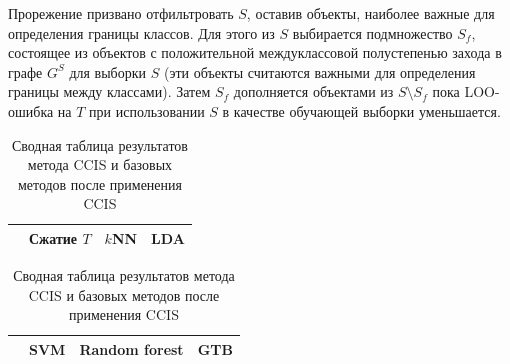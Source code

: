 Прорежение призвано отфильтровать \(S\), оставив объекты, наиболее важные для определения границы классов. Для этого из \(S\) выбирается подмножество \(S_f\), состоящее из объектов с положительной междуклассовой полустепенью захода в графе \(G^S\) для выборки \(S\) (эти объекты считаются важными для определения границы между классами). Затем \(S_f\) дополняется объектами из \(S\setminus S_f\) пока LOO-ошибка на \(T\) при использовании \(S\) в качестве обучающей выборки уменьшается.

\begin{table}[h!]
    \centering
    \begin{tabular}{|c||c||c|c|}
    \cline{2-4}
    \multicolumn{1}{c||}{} & Сжатие \(T\) & \(k\)NN & LDA \\
    \hline \hline
	
\end{tabular}
\newline \vspace*{0.5cm} \newline
\begin{tabular}{|c||c|c|c|}
    \cline{2-4}
    \multicolumn{1}{c||}{} & SVM & Random forest & GTB \\
    \hline \hline
	
    \end{tabular}
    \caption{Сводная таблица результатов метода CCIS и базовых методов после применения CCIS}
    \label{table:ccis-results}
\end{table}

